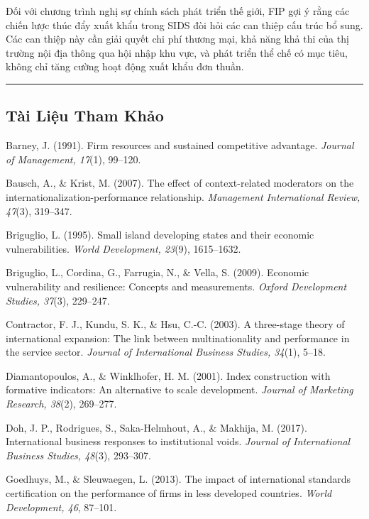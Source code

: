 \documentclass[12pt,a4paper]{article}
\begin{document}
Đối với chương trình nghị sự chính sách phát triển thế giới, FIP gợi ý
rằng các chiến lược thúc đẩy xuất khẩu trong SIDS đòi hỏi các can thiệp
cấu trúc bổ sung. Các can thiệp này cần giải quyết chi phí thương mại,
khả năng khả thi của thị trường nội địa thông qua hội nhập khu vực, và
phát triển thể chế có mục tiêu, không chỉ tăng cường hoạt động xuất khẩu
đơn thuần.

\begin{center}\rule{0.5\linewidth}{0.5pt}\end{center}

\hypertarget{tuxe0i-liux1ec7u-tham-khux1ea3o}{%
\subsection{Tài Liệu Tham Khảo}\label{tuxe0i-liux1ec7u-tham-khux1ea3o}}

Barney, J. (1991). Firm resources and sustained competitive advantage.
\emph{Journal of Management, 17}(1), 99--120.

Bausch, A., \& Krist, M. (2007). The effect of context-related
moderators on the internationalization-performance relationship.
\emph{Management International Review, 47}(3), 319--347.

Briguglio, L. (1995). Small island developing states and their economic
vulnerabilities. \emph{World Development, 23}(9), 1615--1632.

Briguglio, L., Cordina, G., Farrugia, N., \& Vella, S. (2009). Economic
vulnerability and resilience: Concepts and measurements. \emph{Oxford
Development Studies, 37}(3), 229--247.

Contractor, F. J., Kundu, S. K., \& Hsu, C.-C. (2003). A three-stage
theory of international expansion: The link between multinationality and
performance in the service sector. \emph{Journal of International
Business Studies, 34}(1), 5--18.

Diamantopoulos, A., \& Winklhofer, H. M. (2001). Index construction with
formative indicators: An alternative to scale development. \emph{Journal
of Marketing Research, 38}(2), 269--277.

Doh, J. P., Rodrigues, S., Saka-Helmhout, A., \& Makhija, M. (2017).
International business responses to institutional voids. \emph{Journal
of International Business Studies, 48}(3), 293--307.

Goedhuys, M., \& Sleuwaegen, L. (2013). The impact of international
standards certification on the performance of firms in less developed
countries. \emph{World Development, 46}, 87--101.
\end{document}
